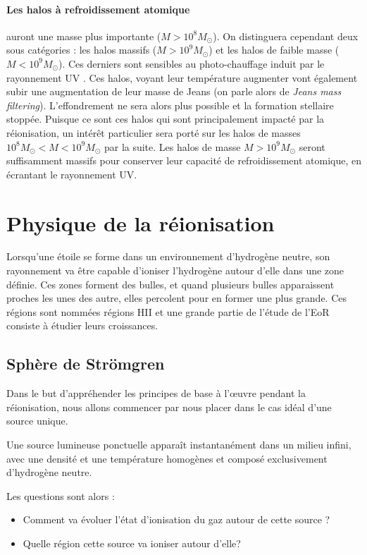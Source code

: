 \paragraph{Les halos à refroidissement atomique} auront une masse plus importante ($M > 10^8 M_\odot$).
On distinguera cependant deux sous catégories : les halos massifs ($M > 10^9 M_\odot$) et les halos de faible masse ($M< 10^9 M_\odot$).
Ces derniers sont sensibles au photo-chauffage induit par le rayonnement UV \citep{1998ApJ...497...21M}.
Ces halos, voyant leur température augmenter vont également subir une augmentation de leur masse de Jeans (on parle alors de \textit{Jeans mass filtering}).
L'effondrement ne sera alors plus possible et la formation stellaire stoppée.
Puisque ce sont ces halos qui sont principalement impacté par la réionisation, un intérêt particulier sera porté sur les halos de masses $10^8 M_\odot < M< 10^9 M_\odot$ par la suite.
Les halos de masse $M > 10^9 M_\odot$ seront suffisamment massifs pour conserver leur capacité de refroidissement atomique, en écrantant le rayonnement UV.

\section{Physique de la réionisation}

Lorsqu'une étoile se forme dans un environnement d'hydrogène neutre, son rayonnement va être capable d'ioniser l'hydrogène autour d'elle dans une zone définie.
Ces zones forment des bulles, et quand plusieurs bulles apparaissent proches les unes des autre, elles percolent pour en former une plus grande.
Ces régions sont nommées régions HII et une grande partie de l'étude de l'\ac{EoR} consiste à étudier leurs croissances.

\subsection{Sphère de Strömgren}
\label{sec:stromgren}

Dans le but d’appréhender les principes de base à l’œuvre pendant la réionisation, nous allons commencer par nous placer dans le cas idéal d'une source unique.

Une source lumineuse ponctuelle apparaît instantanément dans un milieu infini, avec une densité et une température homogènes et composé exclusivement d’hydrogène neutre.

Les questions sont alors : 
\begin{itemize}
\item Comment va évoluer l’état d'ionisation du gaz autour de cette source ?
\item Quelle région cette source va ioniser autour d'elle?
\end{itemize}

